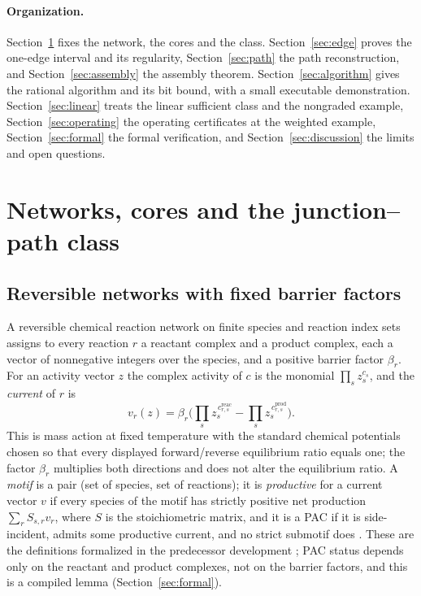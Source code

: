 \documentclass[11pt,a4paper]{article}
\theoremstyle{plain}
\theoremstyle{definition}
\theoremstyle{remark}
\begin{document}
\paragraph{Organization.} Section~\ref{sec:model} fixes the network, the cores and the class. Section~\ref{sec:edge} proves the one-edge interval and its regularity, Section~\ref{sec:path} the path reconstruction, and Section~\ref{sec:assembly} the assembly theorem. Section~\ref{sec:algorithm} gives the rational algorithm and its bit bound, with a small executable demonstration. Section~\ref{sec:linear} treats the linear sufficient class and the nongraded example, Section~\ref{sec:operating} the operating certificates at the weighted example, Section~\ref{sec:formal} the formal verification, and Section~\ref{sec:discussion} the limits and open questions.

\section{Networks, cores and the junction--path class}\label{sec:model}

\subsection{Reversible networks with fixed barrier factors}

A reversible chemical reaction network on finite species and reaction index sets assigns to every reaction $r$ a reactant complex and a product complex, each a vector of nonnegative integers over the species, and a positive barrier factor $\beta_r$. For an activity vector $z$ the complex activity of $c$ is the monomial $\prod_s z_s^{c_s}$, and the \emph{current} of $r$ is
\begin{equation}\label{eq:current}
  v_r(z)=\beta_r\bigl(\textstyle\prod_s z_s^{\,c^{\mathrm{reac}}_{r,s}}-\prod_s z_s^{\,c^{\mathrm{prod}}_{r,s}}\bigr).
\end{equation}
This is mass action at fixed temperature with the standard chemical potentials chosen so that every displayed forward/reverse equilibrium ratio equals one; the factor $\beta_r$ multiplies both directions and does not alter the equilibrium ratio. A \emph{motif} is a pair (set of species, set of reactions); it is \emph{productive} for a current vector $v$ if every species of the motif has strictly positive net production $\sum_r S_{s,r}v_r$, where $S$ is the stoichiometric matrix, and it is a PAC if it is side-incident, admits some productive current, and no strict submotif does \citep{kosc2025}. These are the definitions formalized in the predecessor development \citep{tcic2026}; PAC status depends only on the reactant and product complexes, not on the barrier factors, and this is a compiled lemma (Section~\ref{sec:formal}).
\end{document}
